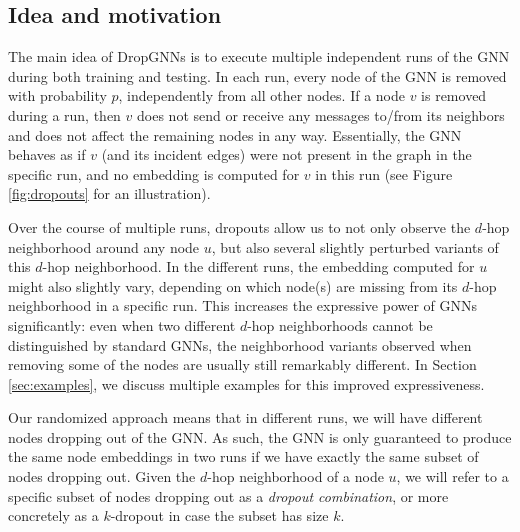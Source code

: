 \documentclass{article}
\begin{document}
\subsection{Idea and motivation}
The main idea of DropGNNs is to execute multiple independent runs of the GNN during both training and testing. In each run, every node of the GNN is removed with probability $p$, independently from all other nodes. If a node $v$ is removed during a run, then $v$ does not send or receive any messages to/from its neighbors and does not affect the remaining nodes in any way. Essentially, the GNN behaves as if $v$ (and its incident edges) were not present in the graph in the specific run, and no embedding is computed for $v$ in this run (see Figure \ref{fig:dropouts} for an illustration).

Over the course of multiple runs, dropouts allow us to not only observe the $d$-hop neighborhood around any node $u$, but also several slightly perturbed variants of this $d$-hop neighborhood. In the different runs, the embedding computed for $u$ might also slightly vary, depending on which node(s) are missing from its $d$-hop neighborhood in a specific run. This increases the expressive power of GNNs significantly: even when two different $d$-hop neighborhoods cannot be distinguished by standard GNNs, the neighborhood variants observed when removing some of the nodes are usually still remarkably different. In Section \ref{sec:examples}, we discuss multiple examples for this improved expressiveness.

Our randomized approach means that in different runs, we will have different nodes dropping out of the GNN. As such, the GNN is only guaranteed to produce the same node embeddings in two runs if we have exactly the same subset of nodes dropping out. Given the $d$-hop neighborhood of a node $u$, we will refer to a specific subset of nodes dropping out as a \textit{dropout combination}, or more concretely as a $k$-dropout in case the subset has size $k$.
\end{document}
